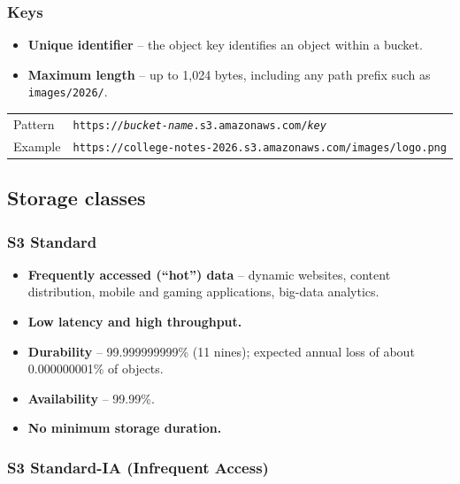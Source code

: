 \documentclass[11pt,a4paper]{article}
\begin{document}
\subsubsection{Keys}

\begin{itemize}\itemsep2pt
  \item \textbf{Unique identifier} -- the object key identifies an object within a bucket.
  \item \textbf{Maximum length} -- up to 1,024 bytes, including any path prefix such as
        \texttt{images/2026/}.
\end{itemize}


\begin{tabularx}{\textwidth}{@{}lX@{}}
Pattern & \texttt{https://\textit{bucket-name}.s3.amazonaws.com/\textit{key}} \\
Example & \texttt{https://college-notes-2026.s3.amazonaws.com/images/logo.png} \\
\end{tabularx}

\subsection{Storage classes}

\subsubsection{S3 Standard}

\begin{itemize}\itemsep2pt
  \item \textbf{Frequently accessed (``hot'') data} -- dynamic websites, content distribution,
        mobile and gaming applications, big-data analytics.
  \item \textbf{Low latency and high throughput.}
  \item \textbf{Durability} -- 99.999999999\% (11 nines); expected annual loss of about
        0.000000001\% of objects.
  \item \textbf{Availability} -- 99.99\%.
  \item \textbf{No minimum storage duration.}
\end{itemize}

\subsubsection{S3 Standard-IA (Infrequent Access)}
\end{document}
